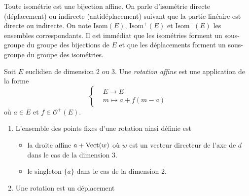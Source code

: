 \begin{rem}
Toute isométrie est une bijection affine. On parle d'isométrie directe (déplacement) ou indirecte (antidéplacement) suivant que la partie linéaire est directe ou indirecte. On note $\mathrm{Isom}(E)$, $\mathrm{Isom}^+(E)$ et $\mathrm{Isom}^-(E)$ les ensembles correspondants. Il est immédiat que les isométries forment un sous-groupe du groupe des bijections de $E$ et que les déplacements forment un sous-groupe du groupe des isométries. 
\end{rem}
\begin{defi}
 Soit $E$ euclidien de dimension $2$ ou $3$. Une \emph{rotation affine} est une application de la forme
\begin{displaymath}
 \left\lbrace 
\begin{aligned}
 &E \rightarrow E \\
 &m \mapsto a+f(m-a)
\end{aligned}
\right. 
\end{displaymath}
où $a\in E$ et $f\in \mathcal O^+(E)$.
\end{defi}
\begin{rems}
\begin{enumerate}
 \item L'ensemble des points fixes d'une rotation ainsi définie est 
\begin{itemize}
 \item la droite affine $a+\mathop{\mathrm{Vect}}(w)$ où $w$ est un vecteur directeur de l'axe de $d$ dans le cas de la dimension $3$.
 \item le singleton $\{a\}$ dans le cas de la dimension $2$. 
\end{itemize}
\item Une rotation est un déplacement
\end{enumerate}
\end{rems}

